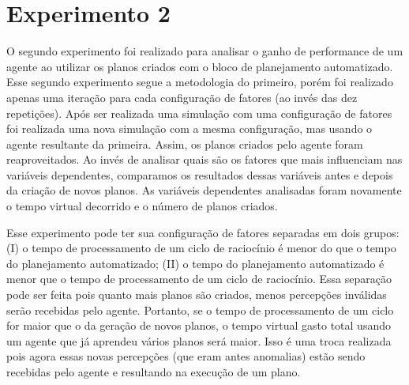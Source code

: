 
\section{Experimento 2}

O segundo experimento foi realizado para analisar o ganho de performance de um agente ao utilizar os planos criados com o bloco de planejamento automatizado. Esse segundo experimento segue a metodologia do primeiro, porém foi realizado apenas uma iteração para cada configuração de fatores (ao invés das dez repetições). Após ser realizada uma simulação com uma configuração de fatores foi realizada uma nova simulação com a mesma configuração, mas usando o agente resultante da primeira. Assim, os planos criados pelo agente foram reaproveitados. Ao invés de analisar quais são os fatores que mais influenciam nas variáveis dependentes, comparamos os resultados dessas variáveis antes e depois da criação de novos planos. As variáveis dependentes analisadas foram novamente o tempo virtual decorrido e o número de planos criados.


Esse experimento pode ter sua configuração de fatores separadas em dois grupos: (I) o tempo de processamento de um ciclo de raciocínio é menor do que o tempo do planejamento automatizado; (II) o tempo do planejamento automatizado é menor que o tempo de processamento de um ciclo de raciocínio. Essa separação pode ser feita pois quanto mais planos são criados, menos percepções inválidas serão recebidas pelo agente. Portanto, se o tempo de processamento de um ciclo for maior que o da geração de novos planos, o tempo virtual gasto total usando um agente que já aprendeu vários planos será maior. Isso é uma troca realizada pois agora essas novas percepções (que eram antes anomalias) estão sendo recebidas pelo agente e resultando na execução de um plano.

